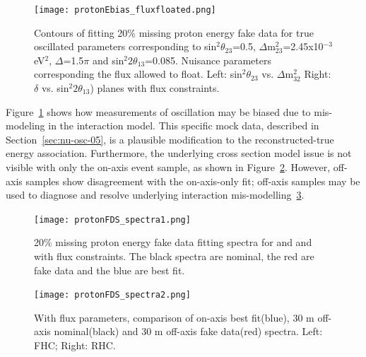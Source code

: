 \begin{figure}[h]
\centering
\texttt{[image: protonEbias\_fluxfloated.png]}
\caption{Contours of fitting 20\% missing proton energy fake data for true oscillated parameters corresponding to  sin$^{2}\theta_{23}$=0.5, $\Delta$m$^{2}_{23}$=2.45x10$^{-3}$ eV$^{2}$, $\Delta$=1.5$\pi$ and sin$^{2}2\theta_{13}$=0.085. Nuisance parameters corresponding the flux allowed to float.
Left: sin$^{2}\theta_{23}$ vs. $\Delta$m$^{2}_{32}$ Right: $\delta$ vs. sin$^{2}2\theta_{13}$) planes with flux constraints.} \label{protonFDSbias}
\end{figure}

Figure~\ref{protonFDSbias} shows how measurements of oscillation may be biased due to mis-modeling in the interaction model. This specific mock data, described in Section~\ref{sec:nu-osc-05}, is a plausible modification to the reconstructed-true energy association. Furthermore, the underlying cross section model issue is not visible with only the on-axis event sample, as shown in Figure~\ref{fig:protonFDS_spectra1}. However, off-axis samples show disagreement with the on-axis-only  fit; off-axis samples may be used to diagnose and resolve underlying interaction mis-modelling~\ref{fig:protonFDS_spectra2}. %


\begin{figure}[h]
\centering
\texttt{[image: protonFDS\_spectra1.png]}
\caption{20\% missing proton energy fake data fitting spectra for  and   and  with flux constraints. The black spectra are nominal, the red are fake data and the blue are best fit.}
\label{fig:protonFDS_spectra1}
\end{figure}

\begin{figure}[h]
\centering
\texttt{[image: protonFDS\_spectra2.png]}
\caption{With flux parameters, comparison of on-axis best fit(blue), 30 m off-axis nominal(black) and 30 m off-axis fake data(red) spectra. Left: FHC; Right: RHC. }
\label{fig:protonFDS_spectra2}
\end{figure}
